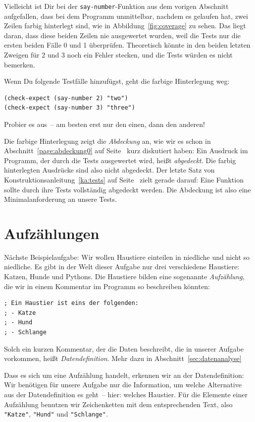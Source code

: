 Vielleicht ist Dir bei der \texttt{say-number}-Funktion aus dem
vorigen Abschnitt aufgefallen, dass bei dem Programm unmittelbar, nachdem
es gelaufen hat, zwei Zeilen farbig
hinterlegt sind, wie in Abbildung~\ref{fig:coverage} zu sehen.  Das liegt
daran, dass diese beiden Zeilen nie ausgewertet wurden, weil die
Tests nur die ersten beiden Fälle 0 und 1 überprüfen.  Theoretisch
könnte in den beiden letzten Zweigen für 2 und 3 noch ein Fehler
stecken, und die Tests würden es nicht bemerken.

Wenn Du folgende Testfälle hinzufügst, geht die farbige Hinterlegung weg:
%
\begin{verbatim}
(check-expect (say-number 2) "two")
(check-expect (say-number 3) "three")
\end{verbatim}
%
Probier es aus~-- am besten erst nur den einen, dann den anderen!

Die farbige Hinterlegung zeigt die \textit{Abdeckung} an, wie wir es
schon in Abschnitt~\ref{page:abdeckung0} auf
Seite~\pageref{page:abdeckung0} kurz diskutiert haben: Ein Ausdruck im
Programm, der durch die Tests ausgewertet wird, heißt
\textit{abgedeckt}.  Die farbig hinterlegten Ausdrücke sind also nicht
abgedeckt.  Der letzte Satz von Konstruktionsanleitung~\ref{ka:tests}
auf Seite~\pageref{ka:tests} zielt gerade darauf: Eine Funktion sollte
durch ihre Tests vollständig abgedeckt werden.  Die Abdeckung ist also
eine Minimalanforderung an unsere Tests.

\section{Aufzählungen}

Nächste Beispielaufgabe: Wir wollen Haustiere einteilen in niedliche
und nicht so niedliche.  Es gibt in der Welt dieser Aufgabe nur drei
verschiedene Haustiere: Katzen, Hunde und Pythons.  Die Haustiere
bilden eine sogenannte \textit{Aufzählung}, die wir
in einem Kommentar im Programm so beschreiben könnten:
%
\label{sec:datendefinition}
\begin{verbatim}
; Ein Haustier ist eins der folgenden:
; - Katze
; - Hund
; - Schlange
\end{verbatim}
%
Solch ein kurzen Kommentar, der die Daten beschreibt, die in unserer
Aufgabe vorkommen, heißt
\textit{Datendefinition}.  Mehr dazu in Abschnitt~\ref{sec:datenanalyse}

Dass es sich um eine Aufzählung handelt, erkennen wir an der
Datendefinition: Wir benötigen für unsere Aufgabe nur die Information,
um welche Alternative aus der Datendefinition es geht~-- hier: welches
Haustier.  Für die Elemente einer Aufzählung benutzen wir 
Zeichenketten mit dem entsprechenden Text, also \verb|"Katze"|,
\verb|"Hund"| und \verb|"Schlange"|.

